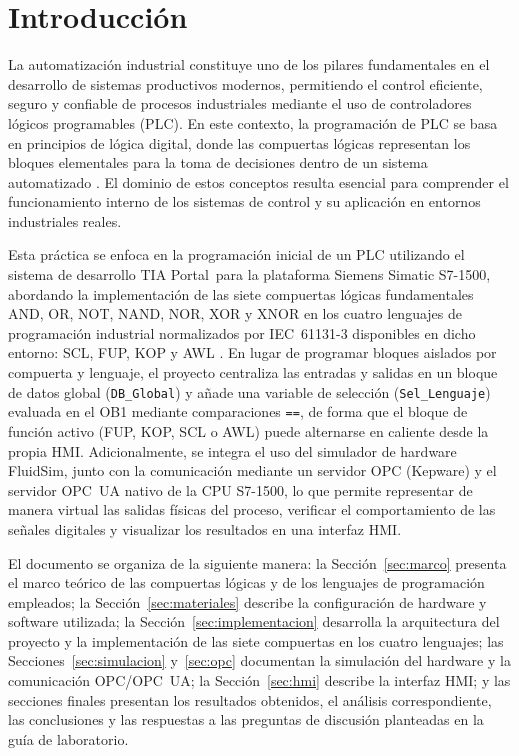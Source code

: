 \documentclass[conference]{IEEEtran}
\begin{document}
\section{Introducción}

La automatización industrial constituye uno de los pilares fundamentales en el desarrollo de sistemas productivos modernos, permitiendo el control eficiente, seguro y confiable de procesos industriales mediante el uso de controladores lógicos programables (PLC). En este contexto, la programación de PLC se basa en principios de lógica digital, donde las compuertas lógicas representan los bloques elementales para la toma de decisiones dentro de un sistema automatizado \cite{john_tiegelkamp}. El dominio de estos conceptos resulta esencial para comprender el funcionamiento interno de los sistemas de control y su aplicación en entornos industriales reales.

Esta práctica se enfoca en la programación inicial de un PLC utilizando el sistema de desarrollo TIA Portal\textregistered\ para la plataforma Siemens Simatic S7-1500, abordando la implementación de las siete compuertas lógicas fundamentales AND, OR, NOT, NAND, NOR, XOR y XNOR en los cuatro lenguajes de programación industrial normalizados por IEC~61131-3 disponibles en dicho entorno: SCL, FUP, KOP y AWL \cite{berger_step7,iec61131_3}. En lugar de programar bloques aislados por compuerta y lenguaje, el proyecto centraliza las entradas y salidas en un bloque de datos global (\texttt{DB\_Global}) y añade una variable de selección (\texttt{Sel\_Lenguaje}) evaluada en el OB1 mediante comparaciones \texttt{==}, de forma que el bloque de función activo (FUP, KOP, SCL o AWL) puede alternarse en caliente desde la propia HMI. Adicionalmente, se integra el uso del simulador de hardware FluidSim\textregistered, junto con la comunicación mediante un servidor OPC (Kepware) y el servidor OPC~UA nativo de la CPU S7-1500, lo que permite representar de manera virtual las salidas físicas del proceso, verificar el comportamiento de las señales digitales y visualizar los resultados en una interfaz HMI.

El documento se organiza de la siguiente manera: la Sección~\ref{sec:marco} presenta el marco teórico de las compuertas lógicas y de los lenguajes de programación empleados; la Sección~\ref{sec:materiales} describe la configuración de hardware y software utilizada; la Sección~\ref{sec:implementacion} desarrolla la arquitectura del proyecto y la implementación de las siete compuertas en los cuatro lenguajes; las Secciones~\ref{sec:simulacion} y~\ref{sec:opc} documentan la simulación del hardware y la comunicación OPC/OPC~UA; la Sección~\ref{sec:hmi} describe la interfaz HMI; y las secciones finales presentan los resultados obtenidos, el análisis correspondiente, las conclusiones y las respuestas a las preguntas de discusión planteadas en la guía de laboratorio.
\end{document}
